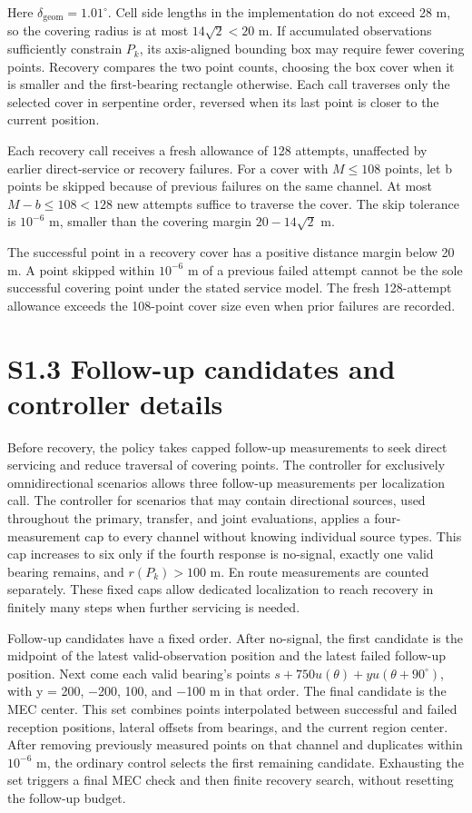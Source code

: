 \documentclass[11pt,letterpaper]{article}
\begin{document}
Here $\delta_{\mathrm{geom}}=1.01^\circ$. Cell side lengths in the implementation do not exceed 28 m, so the covering radius is at most $14\sqrt{2}<20$ m. If accumulated observations sufficiently constrain $P_k$, its axis-aligned bounding box may require fewer covering points. Recovery compares the two point counts, choosing the box cover when it is smaller and the first-bearing rectangle otherwise. Each call traverses only the selected cover in serpentine order, reversed when its last point is closer to the current position.

Each recovery call receives a fresh allowance of 128 attempts, unaffected by earlier direct-service or recovery failures. For a cover with $M\le108$ points, let b points be skipped because of previous failures on the same channel. At most $M-b\le108<128$ new attempts suffice to traverse the cover. The skip tolerance is $10^{-6}$ m, smaller than the covering margin $20-14\sqrt{2}$ m.

The successful point in a recovery cover has a positive distance margin below 20 m. A point skipped within $10^{-6}$ m of a previous failed attempt cannot be the sole successful covering point under the stated service model. The fresh 128-attempt allowance exceeds the 108-point cover size even when prior failures are recorded.

\section*{S1.3 Follow-up candidates and controller details}

Before recovery, the policy takes capped follow-up measurements to seek direct servicing and reduce traversal of covering points. The controller for exclusively omnidirectional scenarios allows three follow-up measurements per localization call. The controller for scenarios that may contain directional sources, used throughout the primary, transfer, and joint evaluations, applies a four-measurement cap to every channel without knowing individual source types. This cap increases to six only if the fourth response is no-signal, exactly one valid bearing remains, and $r(P_k)>100$ m. En route measurements are counted separately. These fixed caps allow dedicated localization to reach recovery in finitely many steps when further servicing is needed.

Follow-up candidates have a fixed order. After no-signal, the first candidate is the midpoint of the latest valid-observation position and the latest failed follow-up position. Next come each valid bearing's points $s+750u(\theta)+yu(\theta+90^\circ)$, with y = 200, \ensuremath{-}200, 100, and \ensuremath{-}100 m in that order. The final candidate is the MEC center. This set combines points interpolated between successful and failed reception positions, lateral offsets from bearings, and the current region center. After removing previously measured points on that channel and duplicates within $10^{-6}$ m, the ordinary control selects the first remaining candidate. Exhausting the set triggers a final MEC check and then finite recovery search, without resetting the follow-up budget.
\end{document}
